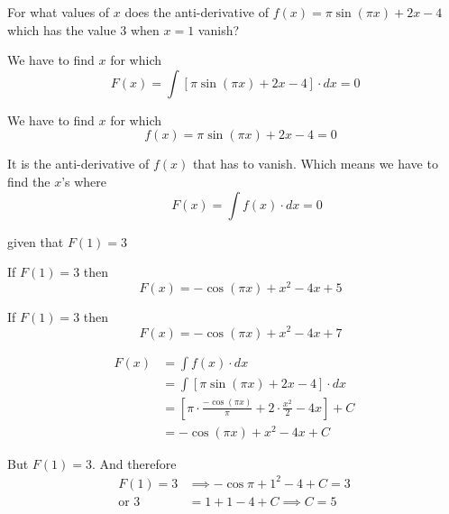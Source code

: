 \documentclass[14pt,fleqn]{extarticle}
\newcommand\fx{\pi\sin \left(\pi x \right) + 2x - 4}
\begin{document}
 
\begin{question}
	\statement 
    
    For what values of $x$ does the anti-derivative of $f(x) = \fx$ which has the value $3$ when $x = 1$ vanish? 
    
    \begin{step}
  \begin{options} 
     \correct 
       
       We have to find $x$ for which 
       \[ \, F(x) = \int \left[\fx \right]\cdot dx = 0  \]
     \incorrect
     
     We have to find $x$ for which 
       \[ \quad f(x) = \fx = 0 \]
        
    \end{options} 
     \reason 
     
     It is the anti-derivative of $f(x)$ that has to vanish. Which means we have to find the $x$'s where 
     \[ \qquad F(x) = \int f(x)\cdot dx = 0 \]
     
     given that $F(1) = 3$ 
       
\end{step} 

\begin{step}
  \begin{options} 
     \correct 
       
       If $F(1) = 3$ then 
       \[\quad F(x) = -\cos \left(\pi x \right) + x^2 - 4x + 5 \]
       
     \incorrect
        
        If $F(1) = 3$ then 
       \[\quad F(x) = -\cos \left(\pi x \right) + x^2 - 4x + 7 \]
    \end{options} 
     \reason 
       
       \begin{align}
	F(x) &= \int f(x)\cdot dx \\
	&= \int \left[\fx \right]\cdot dx \\
	&= \left[\pi\cdot\frac{-\cos \left(\pi x \right)}{\pi} + 2\cdot\frac{x^2}{2} - 4x\right] + C \\
	&= -\cos \left(\pi x \right)+ x^2 - 4x + C
\end{align}

But $F(1) = 3$. And therefore 
\begin{align}
F(1) = 3 &\implies -\cos \pi + 1^2 - 4 + C = 3 	\\
\text{or } 3 &= 1 + 1 -4 + C \implies C = 5 
\end{align}
\end{step}


\end{question}
\end{document}

